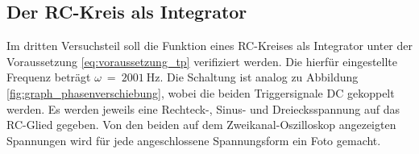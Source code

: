 \subsection{Der RC-Kreis als Integrator}
\label{sec:durchf_c}
Im dritten Versuchsteil soll die Funktion eines RC-Kreises als Integrator unter der Voraussetzung \eqref{eq:voraussetzung_tp} verifiziert werden.
Die hierfür eingestellte Frequenz beträgt $\omega~=~\qty{2001}{\hertz}$.
Die Schaltung ist analog zu Abbildung \ref{fig:graph_phasenverschiebung}, wobei die beiden Triggersignale DC gekoppelt werden.  
Es werden jeweils eine Rechteck-, Sinus- und Dreiecksspannung auf das RC-Glied gegeben.
Von den beiden auf dem Zweikanal-Oszilloskop angezeigten Spannungen wird für jede angeschlossene Spannungsform ein Foto gemacht.